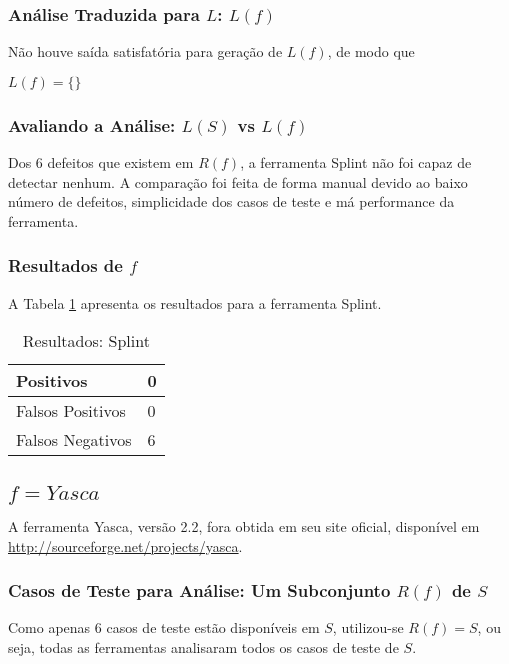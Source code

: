 \subsubsection{Análise Traduzida para $L$: $L(f)$}

Não houve saída satisfatória para geração de $L(f)$, de modo que 

$L(f) = \lbrace\rbrace$

\subsubsection{Avaliando a Análise: $L(S)$ vs $L(f)$}

Dos 6 defeitos que existem em $R(f)$, a ferramenta Splint não foi capaz de detectar nenhum. A comparação foi feita de forma manual devido ao baixo número de defeitos, simplicidade dos casos de teste e má performance da ferramenta.

\subsubsection{Resultados de $f$}

A Tabela \ref{tabela_splint} apresenta os resultados para a ferramenta Splint.
\begin{table}[h]
\caption{Resultados: Splint}
  \centering
\begin{tabular}{l | l}
  \hline
  Positivos & 0 \\ \hline
  Falsos Positivos & 0 \\ \hline
  Falsos Negativos & 6 \\
  \hline
\end{tabular}
\label{tabela_splint}
\end{table}

\subsection{$f = Yasca$}

A ferramenta Yasca, versão 2.2, fora obtida em seu site oficial, disponível em \url{http://sourceforge.net/projects/yasca}.

\subsubsection{Casos de Teste para Análise: Um Subconjunto $R(f)$ de $S$}

Como apenas 6 casos de teste estão disponíveis em $S$, utilizou-se $R(f) = S$, ou seja, todas as ferramentas analisaram todos os casos de teste de $S$.

